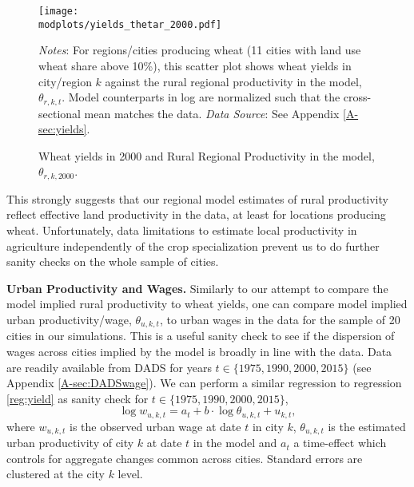 \documentclass[11pt]{report}
\newcommand{\round}{revision3}  %
\newcommand{\modplots}{../../output/model/plots/\round}
\begin{document}
\begin{figure}[h!]	
	\begin{center}
			\texttt{[image: \\modplots/yields\_thetar\_2000.pdf]}
	\end{center}
	\vspace{-0.5cm}
	\caption{Wheat yields in 2000 and Rural Regional Productivity in the model, $\theta_{r,k,2000}$.\label{fig:scatteryield2000}
	}
	{\footnotesize \textit{Notes}: For regions/cities producing wheat (11 cities with land use wheat share above 10\%), this scatter plot shows wheat yields in city/region $k$ against the rural regional productivity in the model, $\theta_{r,k,t}$.  Model counterparts in log are normalized such that the cross-sectional mean matches the data.
		\textit{Data Source}: See Appendix \ref{A-sec:yields}.}
\end{figure}

This strongly suggests that our regional model estimates of rural productivity reflect effective land productivity in the data, at least for locations producing wheat. Unfortunately, data limitations to estimate local productivity in agriculture independently of the crop specialization prevent us to do further sanity checks on the whole sample of cities.

\textbf{Urban Productivity and Wages.} Similarly to our attempt to compare the model implied rural productivity to wheat yields, one can compare model implied urban productivity/wage, $\theta_{u,k,t}$, to urban wages in the data for the sample of 20 cities in our simulations. This is a useful sanity check to see if the dispersion of wages across cities implied by the model is broadly in line with the data. Data are readily available from DADS for years $t \in \{1975, 1990, 2000, 2015\}$ (see Appendix \ref{A-sec:DADSwage}). We can perform a similar regression to regression \ref{reg:yield} as sanity check for $t \in \{1975, 1990, 2000, 2015\}$,
\begin{equation}
\log w_{u,k,t} = a_t + b \cdot \log \theta_{u,k,t} + u_{k,t},
\label{reg:wages}
\end{equation}
where $w_{u,k,t}$ is the observed urban wage at date $t$ in city $k$, $\theta_{u,k,t}$ is the estimated urban productivity of city $k$ at date $t$ in the model and $a_t$ a time-effect which controls for aggregate changes common across cities. Standard errors are clustered at the city $k$ level. 
\end{document}
